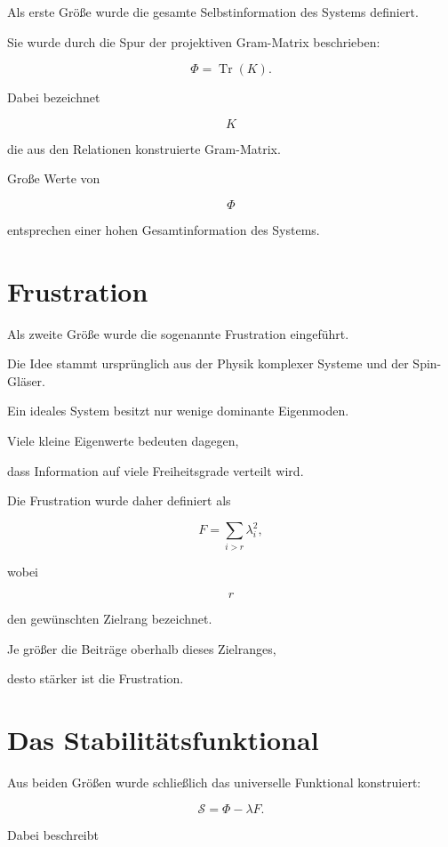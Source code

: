 Als erste Größe wurde die gesamte Selbstinformation des Systems definiert.

Sie wurde durch die Spur der projektiven Gram-Matrix beschrieben:

\[
\Phi
=
\operatorname{Tr}(K).
\]

Dabei bezeichnet

\[
K
\]

die aus den Relationen konstruierte Gram-Matrix.

Große Werte von

\[
\Phi
\]

entsprechen einer hohen Gesamtinformation des Systems.


\section*{Frustration}

Als zweite Größe wurde die sogenannte Frustration eingeführt.

Die Idee stammt ursprünglich aus der Physik komplexer Systeme und der Spin-Gläser.

Ein ideales System besitzt nur wenige dominante Eigenmoden.

Viele kleine Eigenwerte bedeuten dagegen,

dass Information auf viele Freiheitsgrade verteilt wird.

Die Frustration wurde daher definiert als

\[
F
=
\sum_{i>r}
\lambda_i^2,
\]

wobei

\[
r
\]

den gewünschten Zielrang bezeichnet.

Je größer die Beiträge oberhalb dieses Zielranges,

desto stärker ist die Frustration.


\section*{Das Stabilitätsfunktional}

Aus beiden Größen wurde schließlich das universelle Funktional konstruiert:

\[
\boxed{
\mathcal{S}
=
\Phi
-
\lambda F.
}
\]

Dabei beschreibt

